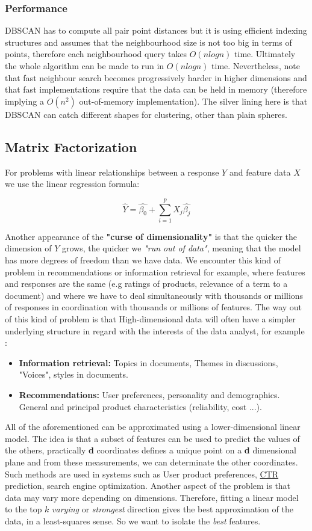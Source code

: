 \subsubsection{Performance}
DBSCAN has to compute all pair point distances but it is using efficient indexing structures and assumes that the neighbourhood size is not too big in terms of points, therefore each neighbourhood query takes $O(n log n)$ time. Ultimately the whole algorithm can be made to run in $O(n log n)$ time. Nevertheless, note that fast neighbour search becomes progressively harder in higher dimensions and that fast implementations require that the data can be held in memory (therefore implying a $O(n^{2})$ out-of-memory implementation). The silver lining here is that DBSCAN can catch different shapes for clustering, other than plain spheres.

\subsection{Matrix Factorization}
For problems with linear relationships between a response $Y$ and feature data $X$ we use the linear regression formula:

$$ \hat{Y} = \hat{\beta_{0}} + \sum_{i=1}^{p} X_{j}  \hat{\beta_{j}} $$

Another appearance of the \textbf{"curse of dimensionality"} is that the quicker the dimension of $Y$ grows, the quicker we \emph{"run out of data"}, meaning that the model has more degrees of freedom than we have data. We encounter this kind of problem in recommendations or information retrieval for example, where features and responses are the same (e.g ratings of products, relevance of a term to a document) and where we have to deal simultaneously with thousands or millions of responses in coordination with thousands or millions of features.
The way out of this kind of problem is that High-dimensional data will often have a simpler underlying structure in regard with the interests of the data analyst, for example :
\begin{itemize}
\item \textbf{Information retrieval:} Topics in documents, Themes in discussions, "Voices", styles in documents.
\item \textbf{Recommendations:} User preferences, personality and demographics. General and principal product characteristics (reliability, cost ...).
\end{itemize}
All of the aforementioned can be approximated using a lower-dimensional linear model. The idea is that a subset of features can be used to predict the values of the others, practically \textbf{d} coordinates defines a unique point on a \textbf{d} dimensional plane and from these measurements, we can determinate the other coordinates. Such methods are used in systems such as User product preferences, \href{https://en.wikipedia.org/wiki/Click-through_rate}{CTR} prediction, search engine optimization.
Another aspect of the problem is that data may vary more depending on dimensions. Therefore, fitting a linear model to the top $k$ \emph{varying} or \emph{strongest} direction gives the best approximation of the data, in a least-squares sense. So we want to isolate the \emph{best} features.

